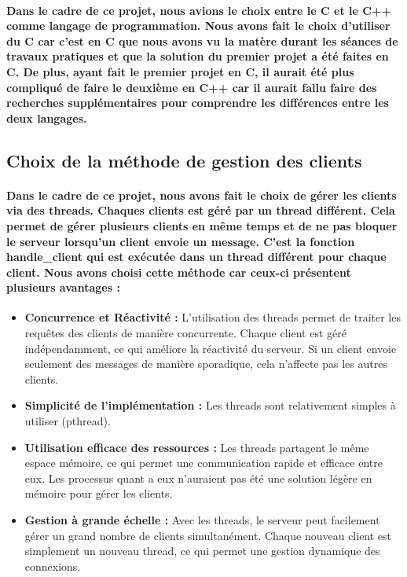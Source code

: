 \documentclass[utf8]{article}
\begin{document}
\paragraph{Dans le cadre de ce projet, nous avions le choix entre le C et le C++ comme langage de programmation.
Nous avons fait le choix d'utiliser du C car c'est en C que nous avons vu la matère durant les séances de travaux 
pratiques et que la solution du premier projet a été faites en C. 
De plus, ayant fait le premier projet en C, il aurait été plus compliqué de faire le deuxième en C++ car il aurait 
fallu faire des recherches supplémentaires pour comprendre les différences entre les deux langages.}

\subsection{Choix de la méthode de gestion des clients}
\paragraph{Dans le cadre de ce projet, nous avons fait le choix de gérer les clients via des threads. Chaques clients est géré par un thread différent.
Cela permet de gérer plusieurs clients en même temps et de ne pas bloquer le serveur lorsqu'un client envoie un message.
C'est la fonction handle\_client qui est exécutée dans un thread différent pour chaque client.
Nous avons choisi cette méthode car ceux-ci présentent plusieurs avantages :}
\begin{itemize}
    \item \textbf{Concurrence et Réactivité :} L'utilisation des threads permet de traiter les requêtes des clients de manière concurrente. Chaque client est géré indépendamment, ce qui améliore la réactivité du serveur. Si un client envoie seulement des messages de manière sporadique, cela n'affecte pas les autres clients.
    \item \textbf{Simplicité de l'implémentation :} Les threads sont relativement simples à utiliser (pthread).
    \item \textbf{Utilisation efficace des ressources :} Les threads partagent le même espace mémoire, ce qui permet une communication rapide et efficace entre eux. Les processus quant a eux n'auraient pas été une solution légère en mémoire pour gérer les clients.
    \item \textbf{Gestion à grande échelle :} Avec les threads, le serveur peut facilement gérer un grand nombre de clients simultanément. Chaque nouveau client est simplement un nouveau thread, ce qui permet une gestion dynamique des connexions.
\end{itemize}
\end{document}
